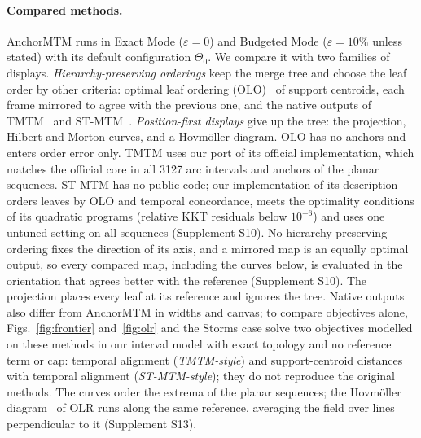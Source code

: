 \documentclass[review]{vgtc}
\begin{document}
\paragraph{Compared methods.} AnchorMTM runs in Exact Mode ($\varepsilon=0$) and Budgeted Mode ($\varepsilon=10\%$ unless stated) with its default configuration $\Theta_0$. We compare it with two families of displays. \emph{Hierarchy-preserving orderings} keep the merge tree and choose the leaf order by other criteria: optimal leaf ordering (OLO)~\cite{BarJoseph:2001:OLO} of support centroids, each frame mirrored to agree with the previous one, and the native outputs of TMTM~\cite{Koepp:2023:TMTM} and ST-MTM~\cite{STMTM:2026}. \emph{Position-first displays} give up the tree: the projection, Hilbert and Morton curves, and a Hovm\"oller diagram. OLO has no anchors and enters order error only. TMTM uses our port of its official implementation, which matches the official core in all 3127 arc intervals and anchors of the planar sequences. ST-MTM has no public code; our implementation of its description orders leaves by OLO and temporal concordance, meets the optimality conditions of its quadratic programs (relative KKT residuals below $10^{-6}$) and uses one untuned setting on all sequences (Supplement S10). No hierarchy-preserving ordering fixes the direction of its axis, and a mirrored map is an equally optimal output, so every compared map, including the curves below, is evaluated in the orientation that agrees better with the reference (Supplement S10). The projection places every leaf at its reference and ignores the tree. Native outputs also differ from AnchorMTM in widths and canvas; to compare objectives alone, Figs.~\ref{fig:frontier} and~\ref{fig:olr} and the Storms case solve two objectives modelled on these methods in our interval model with exact topology and no reference term or cap: temporal alignment (\emph{TMTM-style}) and support-centroid distances with temporal alignment (\emph{ST-MTM-style}); they do not reproduce the original methods. The curves order the extrema of the planar sequences; the Hovm\"oller diagram~\cite{Hovmoller:1949} of OLR runs along the same reference, averaging the field over lines perpendicular to it (Supplement S13).
\end{document}
